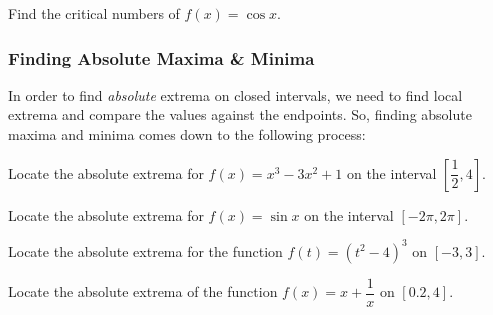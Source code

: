 \documentclass[notes]{subfiles}
\begin{document}
		\begin{ex}
			Find the critical numbers of $f(x) = \cos x$.
		\end{ex}
	\subsubsection*{Finding Absolute Maxima \& Minima}
		In order to find \emph{absolute} extrema on closed intervals, we need to find local extrema and compare the values against the endpoints.  So, finding absolute maxima and minima comes down to the following process:
			\newpage
			
		\begin{ex}
			Locate the absolute extrema for $f(x) = x^3 -3x^2+1$ on the interval $\left[\dfrac{1}{2},4\right]$.
		\end{ex}
			
		\begin{ex}
			Locate the absolute extrema for $f(x) = \sin x$ on the interval $[-2\pi,2\pi]$.
		\end{ex}
			\newpage
			
		\begin{ex}
			Locate the absolute extrema for the function $f(t) = (t^2-4)^3$ on $[-3,3]$.
		\end{ex}
			
		\begin{ex}
			Locate the absolute extrema of the function $f(x) = x + \dfrac{1}{x}$ on $[0.2,4]$.
		\end{ex}
			\newpage
			
\end{document}
